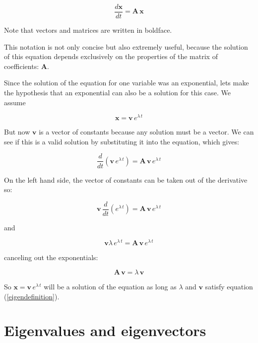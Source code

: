 \documentclass[12pt]{article}
\begin{document}
\begin{equation}
	\label{odenvar_mat}
	\frac{d\mathbf{x}}{dt}  = \mathbf{A} \, \mathbf{x}
\end{equation}

Note that vectors and matrices are written in boldface.

This notation is not only concise but also extremely useful, because the solution of this equation depends exclusively on the properties of the matrix of coefficients: $\mathbf{A}$.

Since the solution of the equation for one variable was an exponential, lets make the hypothesis that an exponential can also be a solution for this case. We assume

\begin{equation}
	\mathbf{x}= \mathbf{v} \, e^{\lambda \, t}
\end{equation}

But now $\mathbf{v}$ is a vector of constants because any solution must be a vector. We can see if this is a valid solution by substituting it into the equation, which gives:

\begin{equation}
	\frac{d}{dt} \left( \mathbf{v} \, e^{\lambda \, t} \right)  = \mathbf{A} \, \mathbf{v} \, e^{\lambda \, t} 
\end{equation}

On the left hand side, the vector of  constants can be taken out of the derivative so:

\begin{equation}
	\mathbf{v} \, \frac{d}{dt} \left(  e^{\lambda \, t} \right)  = \mathbf{A} \, \mathbf{v} \, e^{\lambda \, t} 
\end{equation}
 
 and
 
 \begin{equation}
 	\mathbf{v}   \lambda \, e^{\lambda \, t}   = \mathbf{A} \, \mathbf{v} \, e^{\lambda \, t} 
 \end{equation}
 
canceling out the exponentials:

\begin{equation}
\label{eigendefinition}
\mathbf{A} \, \mathbf{v}  = \lambda  \,	\mathbf{v}   
\end{equation}
 
So $\mathbf{x}=\mathbf{v} \, e^{\lambda \, t}$ will be a solution of the equation as long as $\lambda$ and $\mathbf{v}$ satisfy equation (\ref{eigendefinition}).
\section{Eigenvalues and eigenvectors}
\end{document}
